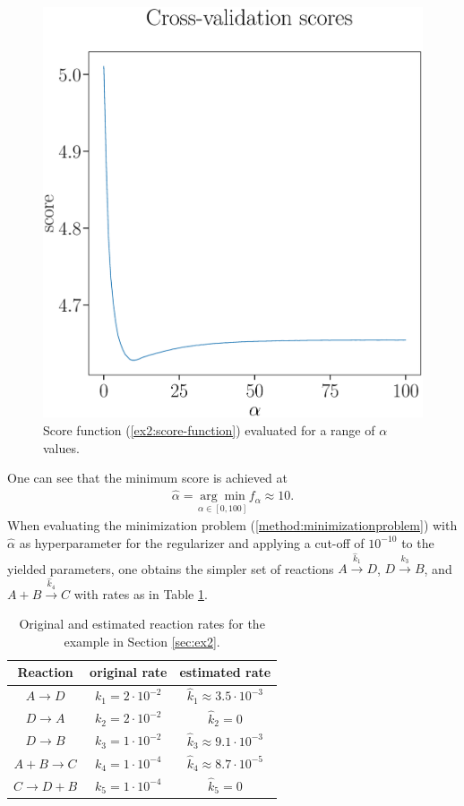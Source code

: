\documentclass[oneside, abstracton, titlepage]{scrartcl}
\begin{document}
	\begin{figure}
		\begin{center}
			\includegraphics[width=.5\textwidth]{./figures_tex/cv_score}
		\end{center}
		\caption{Score function (\ref{ex2:score-function}) evaluated for a range of $\alpha$ values.}
		\label{ex2:score-graph}
	\end{figure}

	One can see that the minimum score is achieved at
	\begin{align}
		\hat{\alpha} = \underset{\alpha\in[0,100]}{\arg\min}f_\alpha\approx 10.
	\end{align}
	When evaluating the minimization problem (\ref{method:minimizationproblem}) with $\hat{\alpha}$ as hyperparameter for the regularizer and applying a cut-off of $10^{-10}$ to the yielded parameters, one obtains the simpler set of reactions $A\xrightarrow{\hat{k}_1}D$, $D\xrightarrow{\hat{k}_3} B$, and $A+B\xrightarrow{\hat{k}_4}C$ with rates as in Table \ref{tab:estimated-rates}.
	
	\begin{table}
		\centering
		\begin{tabular}{ccc}
			Reaction & original rate & estimated rate \\ \hline\noalign{\vskip .1cm}
			$A \to D$ & $k_1 = 2\cdot 10^{-2}$ & $\hat{k}_1 \approx 3.5\cdot 10^{-3}$\\
			$D \to A$ & $k_2 = 2\cdot 10^{-2}$ & $\hat{k}_2 = 0$ \\
			$D\to B$ & $k_3 = 1\cdot 10^{-2}$ & $\hat{k}_3\approx 9.1 \cdot 10^{-3}$ \\
			$A+B\to C$ & $k_4 = 1\cdot 10^{-4}$ & $\hat{k}_4\approx 8.7 \cdot 10^{-5}$ \\
			$C \to D+B$ & $k_5 = 1\cdot 10^{-4}$ & $\hat{k}_5 = 0$ 
		\end{tabular}
		\caption{Original and estimated reaction rates for the example in Section \ref{sec:ex2}.}
		\label{tab:estimated-rates}
	\end{table}
	
\end{document}
